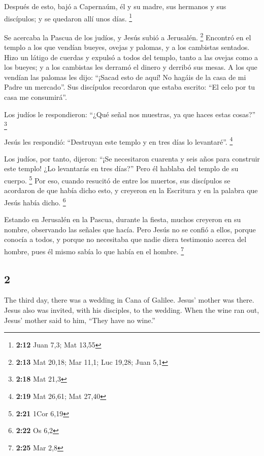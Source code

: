 \begin{paracol}{2}
 Después de esto, bajó a Capernaúm, él y su madre, sus
hermanos y sus discípulos; y se quedaron allí unos días. \footnote{\textbf{2:12}
  Juan 7,3; Mat 13,55}

 Se acercaba la Pascua de los judíos, y Jesús subió a
Jerusalén. \footnote{\textbf{2:13} Mat 20,18; Mar 11,1; Luc 19,28; Juan
  5,1}  Encontró en el templo a los que vendían bueyes,
ovejas y palomas, y a los cambistas sentados.  Hizo un
látigo de cuerdas y expulsó a todos del templo, tanto a las ovejas como
a los bueyes; y a los cambistas les derramó el dinero y derribó sus
mesas.  A los que vendían las palomas les dijo: ``¡Sacad
esto de aquí! No hagáis de la casa de mi Padre un mercado''.
 Sus discípulos recordaron que estaba escrito: ``El celo
por tu casa me consumirá''.

 Los judíos le respondieron: ``¿Qué señal nos muestras,
ya que haces estas cosas?'' \footnote{\textbf{2:18} Mat 21,3}

 Jesús les respondió: ``Destruyan este templo y en tres
días lo levantaré''. \footnote{\textbf{2:19} Mat 26,61; Mat 27,40}

 Los judíos, por tanto, dijeron: ``¡Se necesitaron
cuarenta y seis años para construir este templo! ¿Lo levantarás en tres
días?''  Pero él hablaba del templo de su cuerpo.
\footnote{\textbf{2:21} 1Cor 6,19}  Por eso, cuando
resucitó de entre los muertos, sus discípulos se acordaron de que había
dicho esto, y creyeron en la Escritura y en la palabra que Jesús había
dicho. \footnote{\textbf{2:22} Os 6,2}

 Estando en Jerusalén en la Pascua, durante la fiesta,
muchos creyeron en su nombre, observando las señales que hacía.
 Pero Jesús no se confió a ellos, porque conocía a todos,
 y porque no necesitaba que nadie diera testimonio acerca
del hombre, pues él mismo sabía lo que había en el hombre. \footnote{\textbf{2:25}
  Mar 2,8}

\switchcolumn
\begin{otherlanguage}{english}

\hypertarget{section-3}{%
\section{2}\label{section-3}}

 The third day, there was a wedding in Cana of Galilee.
Jesus' mother was there.  Jesus also was invited, with his
disciples, to the wedding.  When the wine ran out, Jesus'
mother said to him, ``They have no wine.''


\end{otherlanguage}
\end{paracol}
